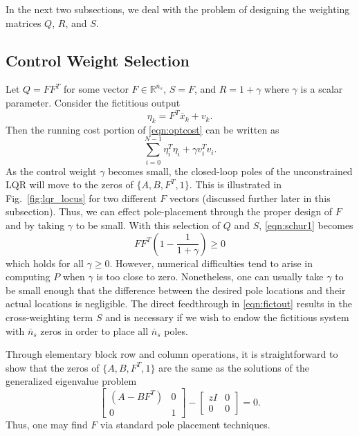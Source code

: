 \documentclass[twocolumn,twoside]{IEEEtran}
\newcommand{\xd}{\ensuremath{\bar x }\xspace}
\begin{document}
In the next two subsections, we deal with the problem of designing the weighting matrices $Q$, $R$, and $S$.

\subsection{Control Weight Selection}
Let $Q = FF^T$ for some vector $F\in\mathds{R}^{\bar{n}_s}$, $S=F$, and $R=1+\gamma$ where $\gamma$ is a scalar parameter. Consider the fictitious output
\begin{equation}
  \eta_k = F^T\xd_k + v_k. \label{eqn:fictout}
\end{equation}
Then the running cost portion of \eqref{eqn:optcost} can be written as
\begin{equation}
   \sum_{i=0}^{N-1} \eta_i^T\eta_i + \gamma v_i^T v_i.
\end{equation}
As the control weight $\gamma$ becomes small, the closed-loop poles of the unconstrained LQR
will move to the zeros of $\{A, B, F^T, 1\}$. This is illustrated in Fig.~\ref{fig:lqr_locus} for two different $F$ vectors (discussed further later in this subsection). Thus, we can effect pole-placement through the proper design of $F$ and by taking $\gamma$ to be small.
With this selection of $Q$ and $S$, \eqref{eqn:schur1} becomes
\begin{equation}
FF^T\left(1 - \frac{1}{1+\gamma} \right)\geq 0
\end{equation}
which holds for all $\gamma\geq 0$. However, numerical difficulties tend to arise in computing $P$ when $\gamma$ is too close to zero. Nonetheless, one can usually take $\gamma$ to be small enough that the difference between the desired pole locations and their actual locations is negligible. The direct feedthrough in \eqref{eqn:fictout} results in the cross-weighting term $S$ and is necessary if we wish to endow the fictitious system with $\bar{n}_s$ zeros in order to place all $\bar{n}_s$ poles.

Through elementary block row and column operations, it is straightforward to show that the zeros of
$\{A, B, F^T, 1\}$ are the same as the solutions of the generalized eigenvalue problem
\begin{equation*}
  \begin{bmatrix}
    (A - BF^T) & 0\\
    0 & 1
  \end{bmatrix} - \begin{bmatrix}zI & 0\\0 & 0\end{bmatrix} = 0.
\end{equation*}
Thus, one may find $F$ via standard pole placement techniques.
\end{document}

